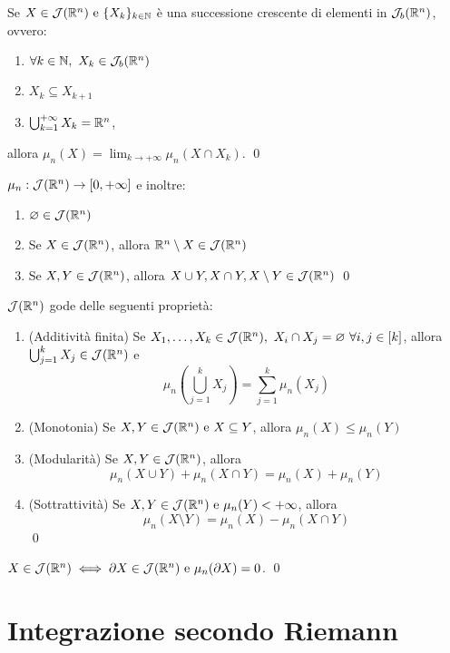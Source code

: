 \begin{theorem}
    Se $X \in \mathcal{J}(\mathbb{R}^n) \text{ e } \{X_k\}_{k \in \mathbb{N}}$ è una successione crescente di elementi in $\mathcal{J}_b(\mathbb{R}^n)$, ovvero:
    \begin{enumerate}
        \item $\forall k \in \mathbb{N}, \ X_k \in \mathcal{J}_b(\mathbb{R}^n)$
        \item $X_k \subseteq X_{k+1}$
        \item $\bigcup_{k=1}^{+\infty}X_k = \mathbb{R}^n$,
    \end{enumerate}
    allora $\mu_n(X)=\displaystyle\lim_{k\to + \infty}\mu_n(X\cap X_k)$.
    \qed
\end{theorem}

\begin{theorem}
    $\mu_n: \mathcal{J}(\mathbb{R}^n) \to [0, +\infty]$ e inoltre:
    \begin{enumerate}
        \item $\varnothing \in \mathcal{J}(\mathbb{R}^n)$
        \item Se $X \in \mathcal{J}(\mathbb{R}^n)$, allora $\mathbb{R}^n \setminus X \in \mathcal{J}(\mathbb{R}^n)$
        \item Se $X, Y \in \mathcal{J}(\mathbb{R}^n)$, allora $X \cup Y, X \cap Y, X \setminus Y \in \mathcal{J}(\mathbb{R}^n)$
        \qed
    \end{enumerate}
\end{theorem}

\begin{theorem}
    $\mathcal{J}(\mathbb{R}^n)$ gode delle seguenti proprietà:
    \begin{enumerate}
        \item (Additività finita) Se $X_1,\dots,X_k \in \mathcal{J}(\mathbb{R}^n), \ X_i \cap X_j = \varnothing \ \forall i, j \in [k]$, allora $\bigcup_{j=1}^kX_j \in \mathcal{J}(\mathbb{R}^n)$ e
        \begin{equation*}
            \mu_n\left(\bigcup_{j=1}^kX_j\right) = \sum_{j=1}^k\mu_n(X_j)
        \end{equation*}
        \item (Monotonia) Se $X, Y \in \mathcal{J}(\mathbb{R}^n) \text{ e } X \subseteq Y$, allora $\mu_n(X) \leq \mu_n(Y)$
        \item (Modularità) Se $X, Y \in \mathcal{J}(\mathbb{R}^n)$, allora
        \begin{equation*}
            \mu_n(X \cup Y) + \mu_n (X \cap Y) = \mu_n(X) + \mu_n(Y)
        \end{equation*}
        \item (Sottrattività) Se $X, Y \in \mathcal{J}(\mathbb{R}^n) \text{ e } \mu_n(Y) < + \infty$, allora
        \begin{equation*}
            \mu_n(X \setminus Y) = \mu_n(X) - \mu_n(X \cap Y)
        \end{equation*}
        \qed
    \end{enumerate}
\end{theorem}

\begin{lemma}
    $X \in \mathcal{J}(\mathbb{R}^n) \iff \partial X \in \mathcal{J}(\mathbb{R}^n) \text{ e } \mu_n(\partial X)=0$.
    \qed
\end{lemma}

\section{Integrazione secondo Riemann}


